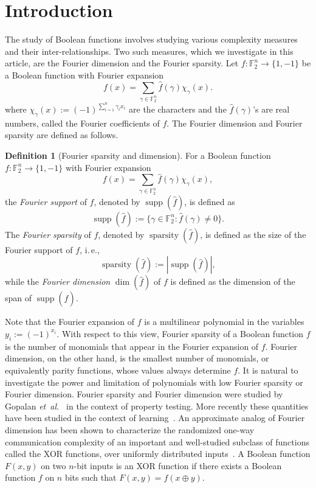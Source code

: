 \documentclass[11pt]{article}
\numberwithin{equation}{section}
\theoremstyle{definition}
\newtheorem{definition}[theorem]{Definition}
\theoremstyle{plain}
\newcommand{\ie}{i.\,e.}
\DeclareMathOperator{\Supp}{supp}
\DeclareMathOperator{\spa}{sparsity}
\DeclareMathOperator{\dimn}{dim}
\newcommand{\etal}{{\it et~al.}}
\begin{document}
\section{Introduction}
\label{intro}
The study of Boolean functions involves studying various complexity measures and their inter-relation\-ships. Two such measures,
which we investigate in this article, are the Fourier dimension and
the Fourier sparsity. Let
$f:\mathbb{F}_2^n \to \{1,-1\}$ be a Boolean function with Fourier expansion
\[f(x)=\sum_{\gamma \in \mathbb{F}_2^n}\widehat{f}(\gamma) \chi_\gamma(x).\]
where $\chi_\gamma(x):=(-1)^{\sum_{i=1}^n \gamma_ix_i}$ are the characters and the $\widehat{f}(\gamma)$'s are real numbers, called the Fourier coefficients of $f$.
The Fourier dimension and Fourier sparsity are defined as follows.
\begin{definition}[Fourier sparsity and dimension]
 For a Boolean function $f:\mathbb{F}_2^n \to \{1,-1\}$ with Fourier expansion
\[f(x)=\sum_{\gamma \in \mathbb{F}_2^n}\widehat{f}(\gamma)
\chi_\gamma(x),\] the \emph{Fourier support} of $f$, denoted by $\Supp(\widehat{f})$,
is defined as 
\[\Supp(\widehat{f}) := \{\gamma \in \mathbb{F}_2^n: \widehat{f}(\gamma) \neq 0\}.\]
The \emph{Fourier sparsity} of $f$, denoted by $\spa(\widehat{f})$, is defined as the size of the Fourier support of $f$,
\ie, 
\[\spa(\widehat{f}) :=|\Supp(\widehat{f})|,\]
while the \emph{Fourier dimension} $\dimn(\widehat{f})$ of $f$ is defined as the
dimension of the span of $\Supp(\widehat{f})$.
\end{definition}
Note that the Fourier expansion of $f$ is a
%
multilinear   %
polynomial in the variables $y_i:=(-1)^{x_i}$. With respect to this view, Fourier sparsity of a Boolean function $f$ is the number of monomials that appear in the Fourier expansion of $f$. Fourier dimension, on the other hand, is the smallest number of monomials, or equivalently parity functions, whose values always determine $f$. It is natural to investigate the power and limitation of polynomials with low Fourier sparsity or Fourier dimension. Fourier sparsity and Fourier dimension were studied by Gopalan \etal~\cite{DBLP:journals/siamcomp/GopalanOSSW11} in the context of property testing. More recently these quantities have been studied in the context of learning~\cite{DBLP:journals/toct/HavivR16, DBLP:journals/corr/abs-1810-00481}. An approximate analog of Fourier dimension has been shown to characterize the randomized one-way communication complexity of an important and well-studied subclass of functions called the XOR functions, over uniformly distributed inputs~\cite{DBLP:conf/coco/KannanMSY18}. A Boolean function $F(x,y)$ on two $n$-bit inputs is an XOR function if there exists a Boolean function $f$ on $n$ bits such that
$F(x,y)=f(x \oplus y)$. %
\end{document}

